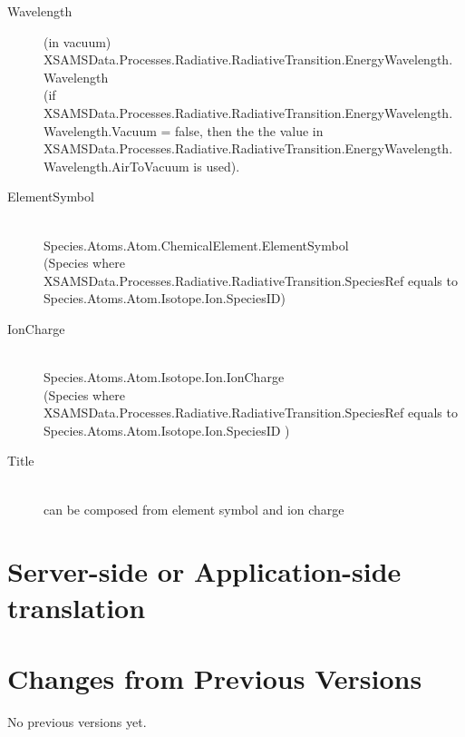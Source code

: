 \documentclass[11pt,a4paper]{ivoa}
\begin{document}
\begin{description}

	
\item [Wavelength] (in vacuum)\hfill\\
	XSAMSData.Processes.Radiative.RadiativeTransition.EnergyWavelength.Wavelength\\
	(if XSAMSData.Processes.Radiative.RadiativeTransition.EnergyWavelength.Wavelength.Vacuum = false,
	then the the value in \\XSAMSData.Processes.Radiative.RadiativeTransition.EnergyWavelength.Wavelength.AirToVacuum 
	is used).
	
\item [ElementSymbol]\hfill\\
	Species.Atoms.Atom.ChemicalElement.ElementSymbol\\
	(Species where XSAMSData.Processes.Radiative.RadiativeTransition.SpeciesRef equals to 
	Species.Atoms.Atom.Isotope.Ion.SpeciesID)
	
\item [IonCharge]\hfill\\
	Species.Atoms.Atom.Isotope.Ion.IonCharge\\
	(Species where XSAMSData.Processes.Radiative.RadiativeTransition.SpeciesRef equals to 
	Species.Atoms.Atom.Isotope.Ion.SpeciesID )


\item [Title]\hfill\\
	can be composed from element symbol and ion charge
\end{description}


\section{Server-side or Application-side translation}


\appendix
\section{Changes from Previous Versions}

No previous versions yet.  



\end{document}
